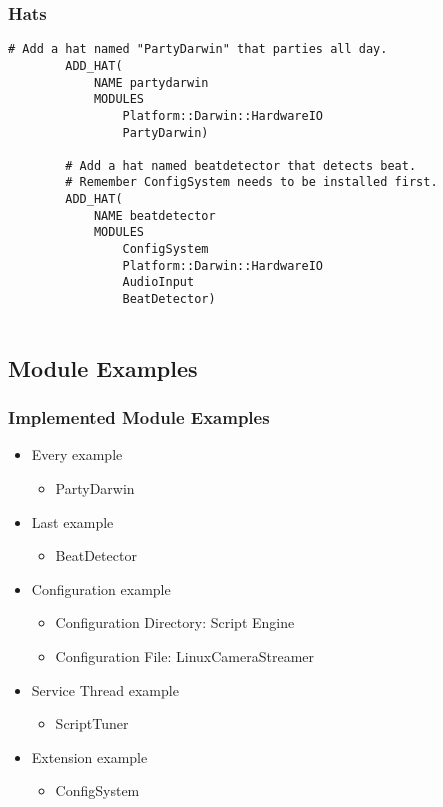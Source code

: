 \documentclass{beamer}
\begin{document}
\begin{frame}[fragile]
	\frametitle{Hats}
	\begin{lstlisting}[language=nuclear-cmake]
		# Add a hat named "PartyDarwin" that parties all day.
		ADD_HAT(
		    NAME partydarwin
		    MODULES
		        Platform::Darwin::HardwareIO
		        PartyDarwin)

		# Add a hat named beatdetector that detects beat.
		# Remember ConfigSystem needs to be installed first.
		ADD_HAT(
		    NAME beatdetector
		    MODULES
		        ConfigSystem
		        Platform::Darwin::HardwareIO
		        AudioInput
		        BeatDetector)
		    
	\end{lstlisting}
\end{frame}

\subsection{Module Examples}
\begin{frame}
	\frametitle{Implemented Module Examples}
	\begin{itemize}
		\item Every example
			\begin{itemize}
				\item PartyDarwin
			\end{itemize}
			
		\item Last example
			\begin{itemize}
				\item BeatDetector
			\end{itemize}
			
		\item Configuration example
			\begin{itemize}
				\item Configuration Directory: Script Engine
				\item Configuration File: LinuxCameraStreamer
			\end{itemize}
			
		\item Service Thread example
			\begin{itemize}
				\item ScriptTuner
			\end{itemize}
			
		\item Extension example
			\begin{itemize}
				\item ConfigSystem
			\end{itemize}
	\end{itemize}
\end{frame}
\end{document}
